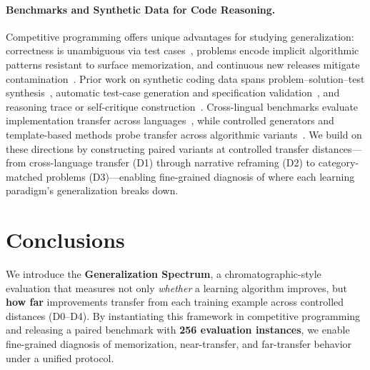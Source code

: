 \documentclass[]{bytedance_seed}
\theoremstyle{plain}
\theoremstyle{definition}
\theoremstyle{remark}
\begin{document}
\paragraph{Benchmarks and Synthetic Data for Code Reasoning.}
Competitive programming offers unique advantages for studying generalization: correctness is unambiguous via test cases~\citep{chen2021evaluating,austin2021program}, problems encode implicit algorithmic patterns resistant to surface memorization, and continuous new releases mitigate contamination~\citep{jain2024livecodebench, quan2025codeelo, zheng2025livecodebench}. Prior work on synthetic coding data spans problem--solution--test synthesis~\citep{liu2025rstarcoder, xu2025kodcode, zeng2025acecoder}, automatic test-case generation and specification validation~\citep{gabel2012testing, he2025hardtests, ma2025dynamicscaling, wang2025codecontestsplus, fu2025klearcodetest}, and reasoning trace or self-critique construction~\citep{ahmad2025opencodereasoning, ahmad2025opencodereasoning2}. Cross-lingual benchmarks evaluate implementation transfer across languages~\citep{cassano2023multiple, peng2024humanevalxl}, while controlled generators and template-based methods probe transfer across algorithmic variants~\citep{sun2025deltacode, zhou2025dpbench, tang2024grapharena}. We build on these directions by constructing paired variants at controlled transfer distances---from cross-language transfer (D1) through narrative reframing (D2) to category-matched problems (D3)---enabling fine-grained diagnosis of where each learning paradigm's generalization breaks down.

\section{Conclusions}

We introduce the \textbf{Generalization Spectrum}, a chromatographic-style evaluation that measures not only \textit{whether} a learning algorithm improves, but \textbf{how far} improvements transfer from each training example across controlled distances (D0--D4). By instantiating this framework in competitive programming and releasing a paired benchmark with \textbf{256 evaluation instances}, we enable fine-grained diagnosis of memorization, near-transfer, and far-transfer behavior under a unified protocol.
\end{document}
